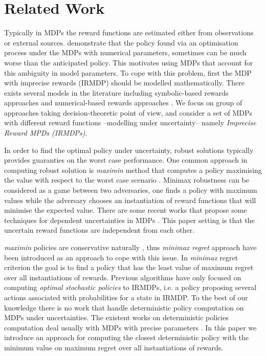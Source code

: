\section{Related Work}

Typically in MDPs the reward functions are estimated either from observations or external sources.  demonstrate that the policy found via an optimisation process under the MDPs with numerical parameters, sometimes can be much worse than the anticipated policy. This motivates using MDPs that account for this ambiguity in model parameters. To cope with this problem, first the MDP with imprecise rewards (IRMDP) should be modelled mathematically. There exists several models in the literature including symbolic-based rewards approaches \cite{Furnkranz2012,Weng2012} and numerical-based rewards approaches \cite{bell1982,Regan2009,Xu2009}. We focus on group of approaches taking decision-theoretic point of view, and consider a set of MDPs with different reward functions --modelling under uncertainty-- namely \textit{Imprecise Reward MPDs (IRMDPs)}. 


In order to find the optimal policy under uncertainty, robust solutions typically provides guaranties on the worst case performance. One common approach in computing robust solution is \textit{maximin} method that computes a policy maximising the value with respect to the worst case scenario \cite{Nilim2005,Iyengar2005,GIVAN2000,mastin2012}. Minimax robustness can be considered as a game between two adversaries, one finds a policy with maximum values while the adversary chooses an instantiation of reward functions that will minimise the expected value. There are some recent works that propose some techniques for dependent uncertainties in MDPs \cite{Wiesemann2013,Mannor2012}. This paper setting is that the uncertain reward functions are independent from each other. 

\textit{maximin} policies are conservative naturally \cite{Delage2007}, thus \textit{minimax regret} approach \cite{Regan2009,Xu2009} have been introduced as an approach to cope with this issue. In \textit{minimax} regret criterion the goal is to find a policy that has the least value of maximum regret over all instantiations of rewards. Previous algorithms \cite{Regan2010,Xu2009,Regan2009} have only focused on computing  \textit{optimal stochastic policies} to IRMDPs, i.e. a policy proposing several actions associated with probabilities for a state in IRMDP. To the best of our knowledge there is no work that handle deterministic policy computation on MDPs under uncertainties. The existent works on deterministic policies computation deal usually with MDPs with precise parameters \cite{Dolgov2005}. In this paper we introduce an approach for computing the closest deterministic policy with the minimum value on maximum regret over all instantiations of rewards. 